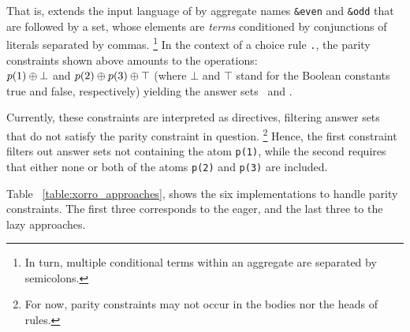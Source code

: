 %

%
That is, \xorro{} extends the input language of \clingo{} by
aggregate names \texttt{\&even} and \texttt{\&odd} that are followed
by a set, whose elements are \emph{terms} conditioned by
conjunctions of literals separated by commas.%
%
\footnote{In turn, multiple conditional terms within an aggregate are
  separated by semicolons.}
%
In the context of a choice rule \texttt{.}, the parity constraints shown above
amounts to the \XOR{} operations: \\
$p(1) \oplus \bot$ and $p(2) \oplus p(3) \oplus \top$
(where $\bot$ and $\top$ stand for the Boolean constants true and false, respectively)
yielding the answer sets~\texttt{} and \texttt{}.


Currently, these constraints are interpreted as directives,
filtering answer sets that do not satisfy the parity constraint in question.
\footnote{For now, parity constraints may not occur in the bodies nor the heads of rules.}
%
Hence, the first
constraint filters out answer sets not containing the atom
\texttt{p(1)}, while the second requires that either none or both of
the atoms \texttt{p(2)} and \texttt{p(3)} are included.

Table~ \ref{table:xorro_approaches}, shows the six implementations to handle parity constraints.
The first three corresponds to the eager, and the last three to the lazy approaches. 

